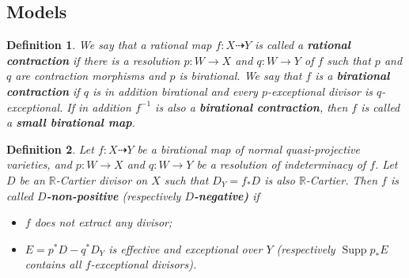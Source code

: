 \documentclass[11pt]{amsart}
\newtheorem{defn}{Definition}[section]
\begin{document}
\subsection{Models}
\begin{defn}
  \cite[\S 2]{haconSarkisovProgram2012} We say that a rational map $f:X\dashrightarrow Y$ is called a \textbf{rational contraction} if there is a resolution $p:W\to X$  and $q:W\to Y$  of $f$  such that $p$  and $q$  are contraction morphisms and $p$  is birational. We say that $f$ is a \textbf{birational contraction} if $q$  is in addition birational and every $p$-exceptional divisor is $q$-exceptional. If in addition $f^{-1}$ is also a \textbf{birational contraction}, then $f$ is called a \textbf{small birational map}.
\end{defn}

\begin{defn}\label{negativemap}
  \cite[Definition 3.6.1]{BCHM10} Let $f:X\dashrightarrow Y$ be a birational map of normal quasi-projective varieties, and $p:W\to X$ and $q:W\to Y$ be a resolution of indeterminacy of $f$. Let $D$ be an $\mathbb{R}$-Cartier divisor on $X$ such that  $D_{Y}=f_*D$ is  also $\mathbb{R}$-Cartier. Then $f$ is called \textbf{$D$-non-positive} (respectively \textbf{$D$-negative)} if
\begin{itemize}
  \item $f$ does not extract any divisor;
  \item $E=p^{*}D-q^*D_Y$ is effective and exceptional over $Y$ (respectively $\operatorname{Supp}p_*E$ contains all $f$-exceptional divisors).
\end{itemize}
\end{defn}
\end{document}
